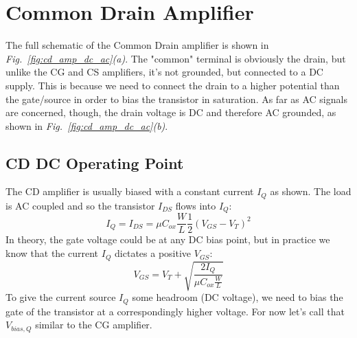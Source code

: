 \newpage
\section{Common Drain Amplifier}
The full schematic of the Common Drain amplifier is shown in \emph{Fig.~\ref{fig:cd_amp_dc_ac}(a)}.  The "common" terminal is obviously the drain, but unlike the CG and CS amplifiers, it's not grounded, but connected to a DC supply.  This is because we need to connect the drain to a higher potential than the gate/source in order to bias the transistor in saturation.  As far as AC signals are concerned, though, the drain voltage is DC and therefore AC grounded, as shown in \emph{Fig.~\ref{fig:cd_amp_dc_ac}(b)}.
\subsection{CD DC Operating Point}
The CD amplifier is usually biased with a constant current $I_Q$ as shown.  The load is AC coupled and so the transistor $I_{DS}$ flows into $I_Q$:
    \begin{equation}
        I_Q = {I_{DS}} = \mu {C_{ox}}\frac{W}{L}\frac{1}{2}{({V_{GS}} - {V_T})^2}	
    \end{equation}
In theory, the gate voltage could be at any DC bias point, but in practice we know that the current $I_Q$ dictates a positive $V_{GS}$:
    \begin{equation}
        {V_{GS}} = {V_T} + \sqrt {\frac{{2{I_{Q}}}}{{\mu {C_{ox}}\frac{W}{L}}}} 
    \end{equation}
To give the current source $I_Q$ some headroom (DC voltage), we need to bias the gate of the transistor at a correspondingly higher voltage.  For now let's call that $V_{bias,Q}$ similar to the CG amplifier.
